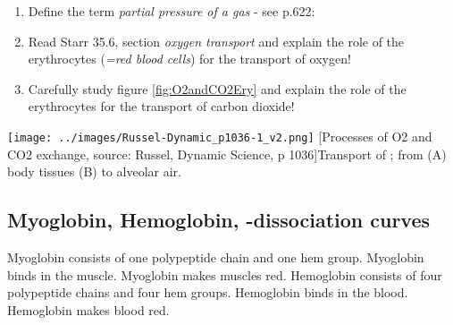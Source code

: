 	\begin{enumerate}[resume, leftmargin=*]
	\item  Define the term \emph{partial pressure of a gas} - see  p.622:

	\item Read  Starr 35.6, section \emph{oxygen transport} and explain the role of the erythrocytes (\textit{=red blood cells}) for the transport of oxygen!

	\item Carefully study figure \ref{fig:O2andCO2Ery} and explain the role of the erythrocytes for the transport of carbon dioxide!
	\end{enumerate}




		\vfill
		\hspace{-2cm}
	\begin{minipage}[htbp]{18cm}
		 \texttt{[image: ../images/Russel-Dynamic\_p1036-1\_v2.png]}
		  [Processes of O2 and CO2 exchange, source: Russel, Dynamic Science, p 1036]{Transport of  ; from (A) body tissues (B) to alveolar air.}
	  \label{fig:O2andCO2Ery}
	\end{minipage}
	\vfill


\clearpage
\subsection{Myoglobin, Hemoglobin,  -dissociation curves}
Myoglobin consists of one polypeptide chain and one hem group.
Myoglobin binds   in the muscle. Myoglobin makes muscles red.
Hemoglobin consists of four polypeptide chains and four hem groups.
Hemoglobin binds   in the blood. Hemoglobin makes blood red.


